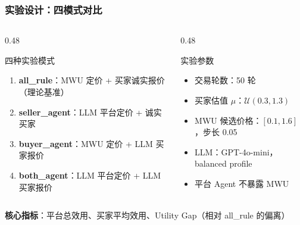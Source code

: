 \documentclass[10pt,aspectratio=169]{beamer}
\begin{document}
\begin{frame}
	\frametitle{实验设计：四模式对比}

	\begin{columns}[T]
		\begin{column}{0.48\textwidth}
			\begin{block}{四种实验模式}
				\small
				\begin{enumerate}
					\item \textbf{all\_rule}：MWU 定价 + 买家诚实报价（理论基准）
					\item \textbf{seller\_agent}：LLM 平台定价 + 诚实买家
					\item \textbf{buyer\_agent}：MWU 定价 + LLM 买家报价
					\item \textbf{both\_agent}：LLM 平台定价 + LLM 买家报价
				\end{enumerate}
			\end{block}
		\end{column}
		\begin{column}{0.48\textwidth}
			\begin{block}{实验参数}
				\small
				\begin{itemize}
					\item 交易轮数：50 轮
					\item 买家估值 $\mu$：$\mathcal{U}(0.3, 1.3)$
					\item MWU 候选价格：$[0.1, 1.6]$，步长 0.05
					\item LLM：GPT-4o-mini，balanced profile
					\item 平台 Agent 不暴露 MWU
				\end{itemize}
			\end{block}
		\end{column}
	\end{columns}

	\vspace{0.3cm}
	\begin{center}
		\textbf{核心指标}：平台总效用、买家平均效用、Utility Gap（相对 all\_rule 的偏离）
	\end{center}
\end{frame}
\end{document}
